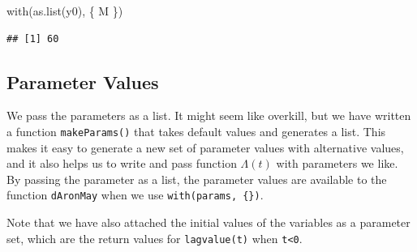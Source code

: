 \documentclass[
]{book}
\newenvironment{Shaded}{\begin{snugshade}}{\end{snugshade}}
\newcommand{\FunctionTok}[1]{\textcolor[rgb]{0.00,0.00,0.00}{#1}}
\newcommand{\NormalTok}[1]{#1}
\begin{document}
\begin{Shaded}
\begin{Highlighting}[]
\FunctionTok{with}\NormalTok{(}\FunctionTok{as.list}\NormalTok{(y0), \{}
\NormalTok{  M}
\NormalTok{\})}
\end{Highlighting}
\end{Shaded}

\begin{verbatim}
## [1] 60
\end{verbatim}

\hypertarget{parameter-values}{%
\subsection{Parameter Values}\label{parameter-values}}

We pass the parameters as a list. It might seem like overkill, but we have written a function \texttt{makeParams()} that takes default values and generates a list. This makes it easy to generate a new set of parameter values with alternative values, and it also helps us to write and pass function \(\Lambda(t)\) with parameters we like. By passing the parameter as a list, the parameter values are available to the function \texttt{dAronMay} when we use \texttt{with(params,\ \{\})}.

Note that we have also attached the initial values of the variables as a parameter set, which are the return values for \texttt{lagvalue(t)} when \texttt{t\textless{}0}.
\end{document}
